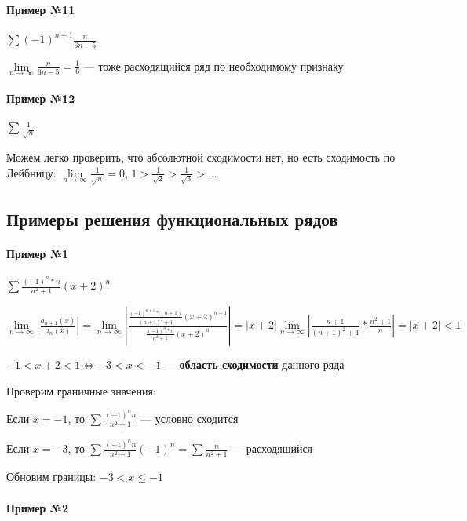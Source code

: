 \documentclass{article}
\begin{document}
\paragraph{Пример №11}

$\sum (-1)^{n + 1} \frac{n}{6 n - 5}$

$\lim\limits_{n \to \infty} \frac{n}{6 n - 5} = \frac{1}{6}$ — тоже расходящийся ряд по необходимому признаку

\paragraph{Пример №12}

$\sum \frac{1}{\sqrt{n}}$

Можем легко проверить, что абсолютной сходимости нет, но есть сходимость по Лейбницу: $\lim\limits_{n \to \infty} \frac{1}{\sqrt{n}} = 0$, $1 > \frac{1}{\sqrt{2}} > \frac{1}{\sqrt{3}} > \dots$

\pagebreak
\subsection{Примеры решения функциональных рядов}

\paragraph{Пример №1}

$\sum \frac{(-1)^{n} * n}{n^2 + 1} (x + 2)^{n}$

$\lim \limits_{n \to \infty} | \frac{a_{n + 1} (x)}{a_{n} (x)} | = \lim\limits_{n \to \infty} | \frac{\frac{(-1)^{n + 1} * (n + 1)}{(n + 1)^2 + 1} (x + 2)^{n + 1}}{\frac{(-1)^{n} * n}{n^2 + 1} (x + 2)^{n}} | = | x + 2 | \lim\limits_{n \to \infty} | \frac{n + 1}{(n + 1)^2 + 1} * \frac{n^2 + 1}{n} | = | x + 2 | < 1$

$-1 < x + 2 < 1 \Longleftrightarrow -3 < x < -1$ — \textbf{область сходимости} данного ряда

Проверим граничные значения:

Если $x = -1$, то $\sum \frac{(-1)^{n} n}{n^2 + 1}$ — условно сходится

Если $x = -3$, то $\sum \frac{(-1)^n n}{n^2 + 1} (-1)^{n} = \sum \frac{n}{n^2 + 1}$ — расходящийся

Обновим границы: $-3 < x \le -1$

\paragraph{Пример №2}
\end{document}
